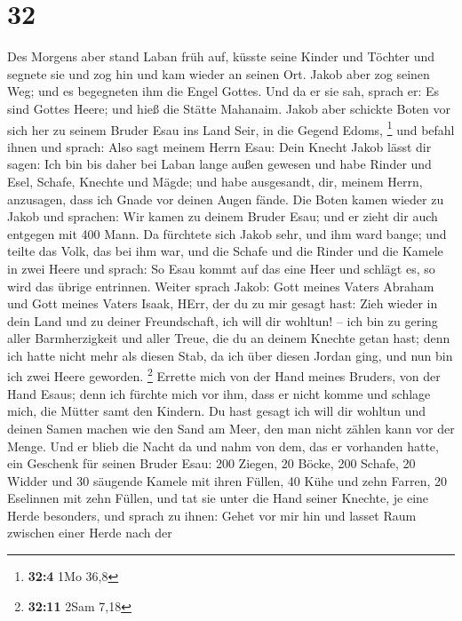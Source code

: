 \hypertarget{section-7}{%
\section{32}\label{section-7}}

 Des Morgens aber stand Laban früh auf, küsste seine Kinder
und Töchter und segnete sie und zog hin und kam wieder an seinen Ort.
 Jakob aber zog seinen Weg; und es begegneten ihm die Engel
Gottes.  Und da er sie sah, sprach er: Es sind Gottes Heere;
und hieß die Stätte Mahanaim.  Jakob aber schickte Boten vor
sich her zu seinem Bruder Esau ins Land Seir, in die Gegend Edoms,
\footnote{\textbf{32:4} 1Mo 36,8}  und befahl ihnen und
sprach: Also sagt meinem Herrn Esau: Dein Knecht Jakob lässt dir sagen:
Ich bin bis daher bei Laban lange außen gewesen  und habe
Rinder und Esel, Schafe, Knechte und Mägde; und habe ausgesandt, dir,
meinem Herrn, anzusagen, dass ich Gnade vor deinen Augen fände.
 Die Boten kamen wieder zu Jakob und sprachen: Wir kamen zu
deinem Bruder Esau; und er zieht dir auch entgegen mit 400 Mann.
 Da fürchtete sich Jakob sehr, und ihm ward bange; und
teilte das Volk, das bei ihm war, und die Schafe und die Rinder und die
Kamele in zwei Heere  und sprach: So Esau kommt auf das eine
Heer und schlägt es, so wird das übrige entrinnen.  Weiter
sprach Jakob: Gott meines Vaters Abraham und Gott meines Vaters Isaak,
HErr, der du zu mir gesagt hast: Zieh wieder in dein Land und zu deiner
Freundschaft, ich will dir wohltun! --  ich bin zu gering
aller Barmherzigkeit und aller Treue, die du an deinem Knechte getan
hast; denn ich hatte nicht mehr als diesen Stab, da ich über diesen
Jordan ging, und nun bin ich zwei Heere geworden. \footnote{\textbf{32:11}
  2Sam 7,18}  Errette mich von der Hand meines Bruders, von
der Hand Esaus; denn ich fürchte mich vor ihm, dass er nicht komme und
schlage mich, die Mütter samt den Kindern.  Du hast gesagt
ich will dir wohltun und deinen Samen machen wie den Sand am Meer, den
man nicht zählen kann vor der Menge.  Und er blieb die
Nacht da und nahm von dem, das er vorhanden hatte, ein Geschenk für
seinen Bruder Esau:  200 Ziegen, 20 Böcke, 200 Schafe, 20
Widder  und 30 säugende Kamele mit ihren Füllen, 40 Kühe
und zehn Farren, 20 Eselinnen mit zehn Füllen,  und tat sie
unter die Hand seiner Knechte, je eine Herde besonders, und sprach zu
ihnen: Gehet vor mir hin und lasset Raum zwischen einer Herde nach der
